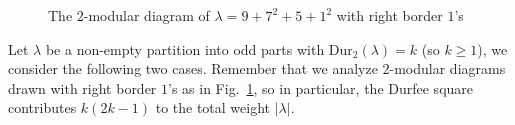 \documentclass[11pt,reqno]{amsart}
\numberwithin{equation}{section}
\theoremstyle{plain}
\theoremstyle{definition}
\theoremstyle{named}
\newcommand{\abs}[1]{\left|#1\right|}
\def\la{\lambda}
\def\Dur{\mathrm{Dur}}
\begin{document}
\begin{figure}[ht]
\begin{ferrers}

\addtext{1.5}{-3}{$[\la]_2$}
\end{ferrers}
\caption{The $2$-modular diagram of $\lambda=9+7^2+5+1^2$ with right border $1$'s}
\label{fig:right border}
\end{figure}

Let $\la$ be a non-empty partition into odd parts with $\Dur_2(\la)=k$ (so $k\ge 1$), we consider the following two cases. Remember that we analyze $2$-modular diagrams drawn with right border $1$'s as in Fig.~\ref{fig:right border}, so in particular, the Durfee square contributes $k(2k-1)$ to the total weight $\abs{\la}$.
\end{document}
